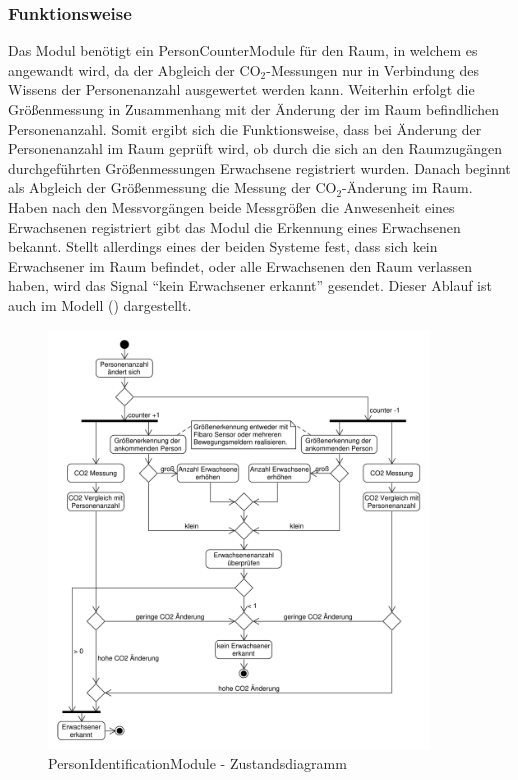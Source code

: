 \subsubsection{Funktionsweise}
Das Modul benötigt ein PersonCounterModule für den Raum, in welchem es angewandt wird, da der Abgleich der CO$_2$-Messungen nur in Verbindung des Wissens der Personenanzahl ausgewertet werden kann. Weiterhin erfolgt die Größenmessung in Zusammenhang mit der Änderung der im Raum befindlichen Personenanzahl. Somit ergibt sich die Funktionsweise, dass bei Änderung der Personenanzahl im Raum geprüft wird, ob durch die sich an den Raumzugängen durchgeführten Größenmessungen Erwachsene registriert wurden. Danach beginnt als Abgleich der Größenmessung die Messung der CO$_2$-Änderung im Raum. Haben nach den Messvorgängen beide Messgrößen die Anwesenheit eines Erwachsenen registriert gibt das Modul die Erkennung eines Erwachsenen bekannt. Stellt  allerdings eines der beiden Systeme fest, dass sich kein Erwachsener im Raum befindet, oder alle Erwachsenen den Raum verlassen haben, wird das Signal "`kein Erwachsener erkannt"' gesendet. Dieser Ablauf ist auch im Modell () dargestellt.

\begin{figure}[h!]
	\centering
	\includegraphics[width=0.9\textwidth]{img/Modulkonzeption/PersonIdentificationStateMachine.pdf}
	\caption{PersonIdentificationModule - Zustandsdiagramm}
	\label{fig:personIdentification}
\end{figure}

